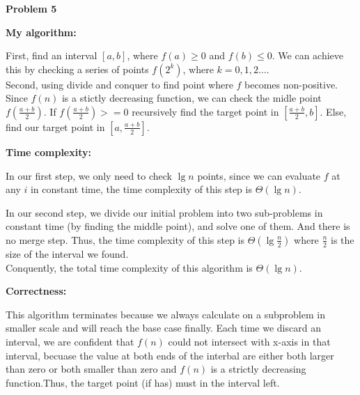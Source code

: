 \documentclass[12pt,letterpaper]{article}
\def\pp{\par\noindent}
\newcommand{\problem}[1]{ \bigskip \pp \textbf{Problem #1}\par}
\begin{document}
\problem{5}
\textbf{My algorithm:}\par
First, find an interval $[a, b]$, where $f(a)\geq0$ and $f(b)\leq0$. We can achieve this by checking a series of points $f(2^k)$, where $k=0, 1, 2\dots$.\\
Second, using divide and conquer to find point where $f$ becomes non-positive. Since $f(n)$ is a stictly decreasing function, we can check the midle point $f(\frac{a+b}{2})$. If $f(\frac{a+b}{2})>=0$ recursively find the target point in $[\frac{a+b}{2}, b]$. Else, find our target point in $[a, \frac{a+b}{2}]$.\par
\textbf{Time complexity:}\par
In our first step, we only need to check $\lg n$ points, since we can evaluate $f$ at any $i$ in constant time, the time complexity of this step is $\Theta(\lg n)$.\par
In our second step, we divide our initial problem into two sub-problems in constant time (by finding the middle point), and solve one of them. And there is no merge step. Thus, the time complexity of this step is $\Theta(\lg \frac{n}{2})$ where $\frac{n}{2}$ is the size of the interval we found.\\
Conquently, the total time complexity of this algorithm is $\Theta(\lg n)$.\par
\textbf{Correctness:}\par
This algorithm terminates because we always calculate on a subproblem in smaller scale and will reach the base case finally. Each time we discard an interval, we are confident that $f(n)$ could not intersect with x-axis in that interval, becuase the value at both ends of the interbal are either both larger than zero or both smaller than zero and $f(n)$ is a strictly decreasing function.Thus, the target point (if has) must in the interval left.\par
\end{document}
